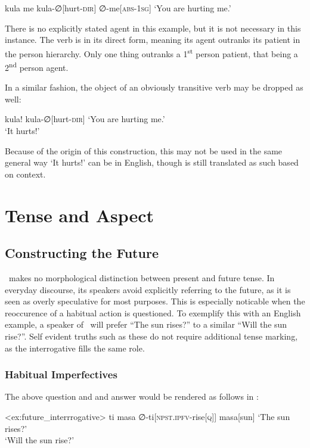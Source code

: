 \ex
\begingl
\glpreamble kula me
\endpreamble
kula-∅[hurt-\textsc{dir}]
∅-me[\textsc{abs-1sg}]
\glft `You are hurting me.'
\endgl
\xe

There is no explicitly stated agent in this example, but it is not necessary in this instance. The verb  is in its direct form, meaning its agent outranks its patient in the person hierarchy. Only one thing outranks a 1\textsuperscript{st} person patient, that being a 2\textsuperscript{nd} person agent.

In a similar fashion, the object of an obviously transitive verb may be dropped as well:

\ex
\begingl
\glpreamble kula!
\endpreamble
kula-∅[hurt-\textsc{dir}]
\glft `You are hurting me.'\\`It hurts!'
\endgl
\xe

Because of the origin of this construction, this may not be used in the same general way `It hurts!' can be in English, though  is still translated as such based on context.

\section{Tense and Aspect}
\subsection{Constructing the Future}

\langname\ makes no morphological distinction between present and future tense. In everyday discourse, its speakers avoid explicitly referring to the future, as it is seen as overly speculative for most purposes. This is especially noticable when the reoccurence of a habitual action is questioned. To exemplify this with an English example, a speaker of \langname\ will prefer ``The sun rises?'' to a similar ``Will the sun rise?''. Self evident truths such as these do not require additional tense marking, as the interrogative fills the same role.

\subsubsection{Habitual Imperfectives}

The above question and and answer would be rendered as follows in \langname :

\ex<ex:future_interrrogative>
\begingl
\glpreamble ti masa
\endpreamble
∅-ti[\textsc{npst.ipfv-}rise\textsc{[q]}]
masa[sun]
\glft `The sun rises?'\\`Will the sun rise?'
\endgl
\xe

